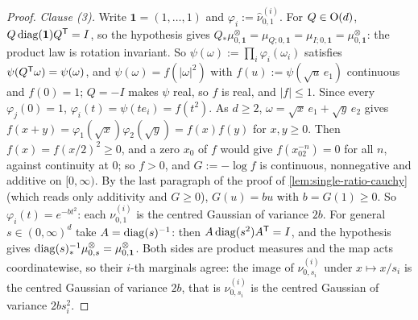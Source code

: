 \begin{proof}
\emph{Clause (3).} Write $\mathbf 1 = (1,\dots,1)$ and
$\varphi_i := \widehat\nu^{(i)}_{0,1}$. For $Q \in \mathrm{O}(d)$, $Q\operatorname{diag}(\mathbf 1)Q^{\mathsf{T}} = I$, so the
hypothesis gives $Q_*\mu^\otimes_{0,\mathbf 1} = \mu_{Q;0,\mathbf 1} = \mu_{I;0,\mathbf 1}
= \mu^\otimes_{0,\mathbf 1}$: the product law is rotation invariant. So
$\psi(\omega) := \prod_i\varphi_i(\omega_i)$ satisfies $\psi(Q^{\mathsf{T}}\omega) = \psi(\omega)$, and
$\psi(\omega) = f(|\omega|^2)$ with $f(u) := \psi(\sqrt u\,e_1)$ continuous and $f(0) = 1$;
$Q = -I$ makes $\psi$ real, so $f$ is real, and $|f| \le 1$. Since every $\varphi_j(0) = 1$,
$\varphi_i(t) = \psi(te_i) = f(t^2)$. As $d \ge 2$, $\omega = \sqrt x\,e_1 + \sqrt y\,e_2$ gives
$f(x+y) = \varphi_1(\sqrt x)\varphi_2(\sqrt y) = f(x)f(y)$ for $x, y \ge 0$. Then
$f(x) = f(x/2)^2 \ge 0$, and a zero $x_0$ of $f$ would give $f(x_02^{-n}) = 0$ for all $n$, against
continuity at $0$; so $f > 0$, and $G := -\log f$ is continuous, nonnegative and additive on
$[0,\infty)$. By the last paragraph of the proof of \ref{lem:single-ratio-cauchy} (which reads only
additivity and $G \ge 0$), $G(u) = bu$ with $b = G(1) \ge 0$. So
$\varphi_i(t) = e^{-bt^2}$: each $\nu^{(i)}_{0,1}$ is the centred Gaussian of variance $2b$.
For general $s \in (0,\infty)^d$ take $A = \operatorname{diag}(s)^{-1}$: then $A\operatorname{diag}(s^2)A^{\mathsf{T}} = I$, and the
hypothesis gives $\operatorname{diag}(s)^{-1}_*\mu^\otimes_{0,s} = \mu^\otimes_{0,\mathbf 1}$. Both sides are
product measures and the map acts coordinatewise, so their $i$-th marginals agree: the image of
$\nu^{(i)}_{0,s_i}$ under $x \mapsto x/s_i$ is the centred Gaussian of variance $2b$, that is
$\nu^{(i)}_{0,s_i}$ is the centred Gaussian of variance $2bs_i^2$.
\end{proof}

